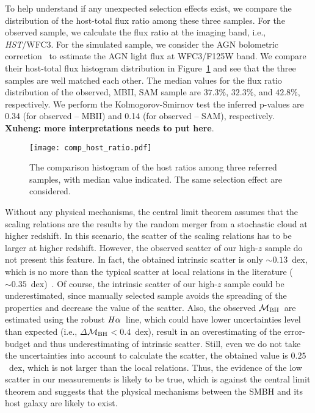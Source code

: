 \documentclass{natureprintstyle}
\newcommand{\hst}{{\it HST}}
\newcommand{\mbh}{$\mathcal M_{\rm BH}$}
\newcommand{\halpha}{${\it H}\alpha$}
\begin{document}
To help understand if any unexpected selection effects exist, we compare the distribution of the host-total flux ratio among these three samples. For the observed sample, we calculate the flux ratio at the imaging band, i.e., \hst/WFC3. For the simulated sample, we consider the AGN bolometric correction~\cite{Elvis1994} to estimate the AGN light flux at WFC3/F125W band. We compare their host-total flux histogram distribution in Figure~\ref{fig:comp_hist} and see that the three samples are well matched each other. The median values for the flux ratio distribution of the observed, MBII, SAM sample are $37.3\%$, $32.3\%$, and $42.8\%$, respectively. We perform the Kolmogorov-Smirnov test the inferred p-values are 0.34 (for observed -- MBII) and 0.14 (for observed -- SAM), respectively. {\bf Xuheng: more interpretations needs to put here}.

\begin{figure}[t]
\texttt{[image: comp\_host\_ratio.pdf]}
\caption{The comparison histogram of the host ratios among three referred samples, with median value indicated. The same selection effect are considered.
}
\label{fig:comp_hist}
\end{figure}

Without any physical mechanisms, the central limit theorem assumes that the scaling relations are the results by the random merger from a stochastic cloud at higher redshift. In this scenario, the scatter of the scaling relations has to be larger at higher redshift. However, the observed scatter of our high-$z$ sample do not present this feature. In fact, the obtained intrinsic scatter is only $\sim0.13$~dex, which is no more than the typical scatter at local relations in the literature ($\sim0.35$~dex)~\cite{Kormendy13, Gul++09}. Of course, the intrinsic scatter of our high-$z$ sample could be underestimated, since manually selected sample avoids the spreading of the properties and decrease the value of the scatter. Also, the observed \mbh\ are estimated using the robust \halpha\ line, which could have lower uncertainties level than expected (i.e., $\Delta$\mbh$<0.4$~dex), result in an overestimating of the error-budget and thus underestimating of intrinsic scatter. Still, even we do not take the uncertainties into account to calculate the scatter, the obtained value is $0.25$~dex, which is not larger than the local relations. Thus, the evidence of the low scatter in our measurements is likely to be true, which is against the central limit theorem and suggests that the physical mechanisms between the SMBH and its host galaxy are likely to exist. 
\end{document}
